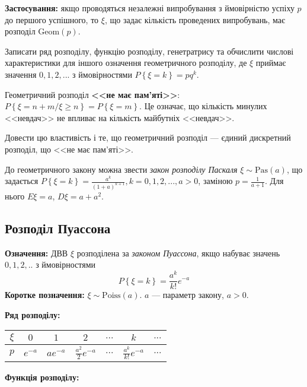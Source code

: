 \noindent\textbf{Застосування:} якщо проводяться незалежні випробування з ймовірністю успіху $p$ до першого успішного,
то $\xi$, що задає кількість проведених випробувань, має розподіл $\mathrm{Geom}(p)$.

\begin{exercise}
    Записати ряд розподілу, функцію розподілу, генетратрису та обчислити
    числові характеристики для іншого означення геометричного розподілу, 
    де $\xi$ приймає значення $0,1,2,...$ з ймовірностями $P\left\{\xi = k\right\} = pq^k$.
\end{exercise}
Геометричний розподіл \textbf{<<не має пам'яті>>}: $P\left\{\xi = n+m / \xi \geq n\right\} = P\left\{\xi = m\right\}$.
Це означає, що кількість минулих <<невдач>> не впливає на кількість майбутніх <<невдач>>.
\begin{exercise}
    Довести цю властивість і те, що геометричний розподіл --- 
    єдиний дискретний розподіл, що <<не має пам'яті>>.
\end{exercise}
До геометричного закону можна звести \emph{закон розподілу Паскаля} $\xi \sim \mathrm{Pas}(a)$,
що задається $P\left\{\xi = k\right\} = \frac{a^k}{(1+a)^{k+1}}, k = 0,1,2,..., a>0$,
заміною $p=\frac{1}{a+1}$. Для нього $E\xi = a$, $D\xi = a + a^2$.

\subsection{Розподіл Пуассона}
\noindent\textbf{Означення:}
    ДВВ $\xi$ розподілена за \emph{законом Пуассона}, 
    якщо набуває значень $0,1,2,..$ з ймовірностями \begin{equation}
        P\left\{\xi = k\right\} = \frac{a^k}{k!}e^{-a}
    \end{equation}
    \textbf{Коротке позначення:} $\xi \sim \mathrm{Poiss}(a)$.
    $a$ --- параметр закону, $a > 0$.

\noindent\textbf{Ряд розподілу:}

\begin{tabular}{|c|c|c|c|c|c|c|}
    \hline
    $\xi$ & $0$ & $1$ & $2$ & $...$ & $k$ & $...$ \\
    \hline
    $p$ & $e^{-a}$ & $ae^{-a}$ & $\frac{a^2}{2}e^{-a}$ & $...$ & $\frac{a^k}{k!}e^{-a}$ & $...$\\
    \hline
\end{tabular}

\noindent\textbf{Функція розподілу:}

